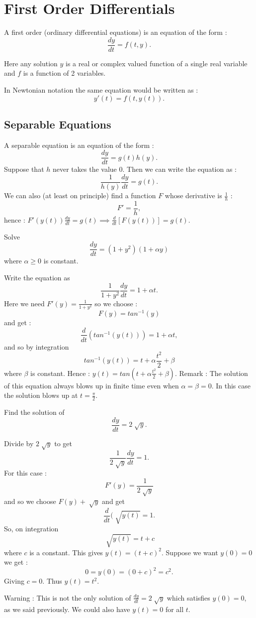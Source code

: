 
\chapter{First Order Differentials}

A first order (ordinary differential equations) is an equation of the form : $$\frac{dy}{dt} = f(t,y).$$

Here any solution $y$ is a real or complex valued function of a single real variable and $f$ is a function of 2 variables.

In Newtonian notation the same equation would be written as : $$y'(t) = f(t,y(t)).$$
\section{Separable Equations}

A separable equation is an equation of the form : $$\frac{dy}{dt} = g(t)h(y).$$
Suppose that $h$ never takes the value 0. Then we can write the equation as : $$\frac{1}{h(y)}\frac{dy}{dt}  = g(t).$$
We can also (at least on principle) find a function $F$ whose derivative is $\frac{1}{h}$ : $$F' = \frac{1}{h},$$
hence : $F'(y(t))\frac{dy}{dt} = g(t) \implies \frac{d}{dt}[F(y(t))] = g(t).$

\bigskip

\begin{example}  Solve $$\frac{dy}{dt} = (1+y^2)(1+\alpha{y})$$ where $\alpha \geq 0$ is constant. \newline
\begin{solution} Write the equation as $$\frac{1}{1+y^2}\frac{dy}{dt} = 1 + \alpha{t}.$$
Here we need $F'(y) = \frac{1}{1+y^2}$ so we choose : $$F(y) = tan^{-1}(y)$$ and get : $$\frac{d}{dt}(tan^{-1}(y(t))) = 1 + \alpha{t},$$
and so by integration $$tan^{-1}(y(t)) = t +\alpha{\frac{t^2}{2}} + \beta$$ where $\beta$ is constant.
Hence : $y(t) = tan( t +\alpha\frac{t^2}{2} + \beta).$
Remark : The solution of this equation always blows up in finite time even when $\alpha = \beta = 0 $. In this case the solution blows up at $t = \frac{\pi}{2}$.
\end{solution}
\end{example}
\bigskip

\begin{example}  Find the solution of $$\frac{dy}{dt} = 2\sqrt[]{y}.$$
\begin{solution} Divide by $2\sqrt[]{y}$ to get $$ \frac{1}{2\sqrt[]{y}}\frac{dy}{dt} = 1.$$
For this case : $$F'(y) = \frac{1}{2\sqrt[]{y}}$$ and so we choose $F(y) + \sqrt[]{y}$ and get $$\frac{d}{dt}(\sqrt[]{y(t)} = 1.$$
So, on integration $$\sqrt[]{y(t)} = t + c $$ where $c$ is a constant.
This gives $y(t) = (t + c)^2.$
Suppose we want $y(0) = 0$ we get : $$0 = y(0) = (0 + c)^2 = c^2.$$
Giving $c = 0$. Thus $y(t) = t^2.$

Warning : This is not the only solution of $\frac{dy}{dt} = 2\sqrt[]{y}$ which satisfies $y(0) = 0$, as we said previously. We could also have $y(t) = 0$ for all $t$.
\end{solution}
\end{example}

